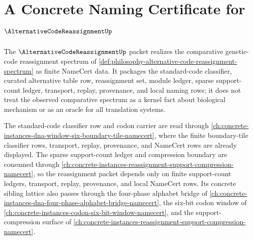 \chapter{A Concrete Naming Certificate for $\AlternativeCodeReassignmentUp$}
\label{ch:concrete-instances-alternative-code-reassignment-namecert}

The $\AlternativeCodeReassignmentUp$ packet realizes the comparative genetic-code reassignment spectrum of \autoref{def:philosophy-alternative-code-reassignment-spectrum} as finite NameCert data. It packages the standard-code classifier, curated alternative table row, reassignment set, module ledger, sparse support-count ledger, transport, replay, provenance, and local naming rows; it does not treat the observed comparative spectrum as a kernel fact about biological mechanism or as an oracle for all translation systems.

The standard-code classifier row and codon carrier are read through \autoref{ch:concrete-instances-dna-window-six-boundary-tile-namecert}, where the finite boundary-tile classifier rows, transport, replay, provenance, and NameCert rows are already displayed. The sparse support-count ledger and compression boundary are consumed through \autoref{ch:concrete-instances-reassignment-support-compression-namecert}, so the reassignment packet depends only on finite support-count ledgers, transport, replay, provenance, and local NameCert rows. Its concrete sibling lattice also passes through the four-phase alphabet bridge of \autoref{ch:concrete-instances-dna-four-phase-alphabet-bridge-namecert}, the six-bit codon window of \autoref{ch:concrete-instances-codon-six-bit-window-namecert}, and the support-compression surface of \autoref{ch:concrete-instances-reassignment-support-compression-namecert}.

